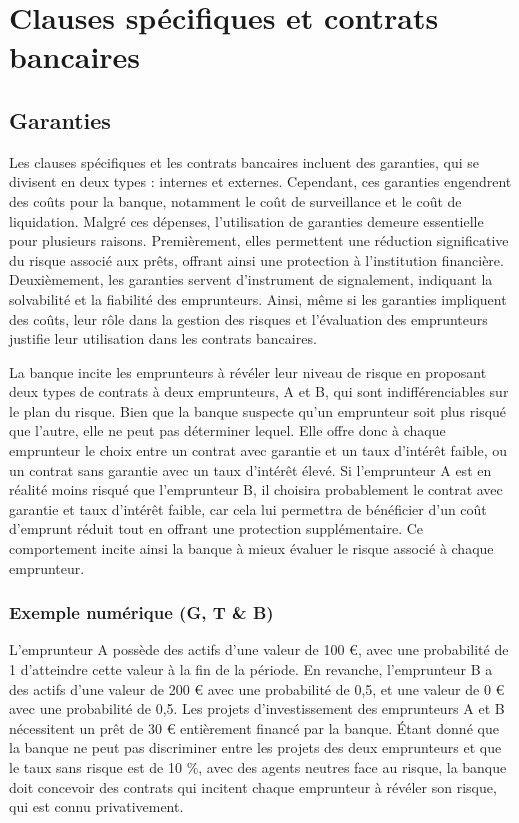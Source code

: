 \documentclass[a4paper, 12pt]{report}
\begin{document}
\section{Clauses spécifiques et contrats bancaires}

\subsection{Garanties}

Les clauses spécifiques et les contrats bancaires incluent des garanties, qui se divisent en deux types : internes et externes. Cependant, ces garanties engendrent des coûts pour la banque, notamment le coût de surveillance et le coût de liquidation. Malgré ces dépenses, l'utilisation de garanties demeure essentielle pour plusieurs raisons. Premièrement, elles permettent une réduction significative du risque associé aux prêts, offrant ainsi une protection à l'institution financière. Deuxièmement, les garanties servent d'instrument de signalement, indiquant la solvabilité et la fiabilité des emprunteurs. Ainsi, même si les garanties impliquent des coûts, leur rôle dans la gestion des risques et l'évaluation des emprunteurs justifie leur utilisation dans les contrats bancaires.

La banque incite les emprunteurs à révéler leur niveau de risque en proposant deux types de contrats à deux emprunteurs, A et B, qui sont indifférenciables sur le plan du risque. Bien que la banque suspecte qu'un emprunteur soit plus risqué que l'autre, elle ne peut pas déterminer lequel. Elle offre donc à chaque emprunteur le choix entre un contrat avec garantie et un taux d'intérêt faible, ou un contrat sans garantie avec un taux d'intérêt élevé. Si l'emprunteur A est en réalité moins risqué que l'emprunteur B, il choisira probablement le contrat avec garantie et taux d'intérêt faible, car cela lui permettra de bénéficier d'un coût d'emprunt réduit tout en offrant une protection supplémentaire. Ce comportement incite ainsi la banque à mieux évaluer le risque associé à chaque emprunteur.

\subsubsection{Exemple numérique (G, T \& B)}

L'emprunteur A possède des actifs d'une valeur de 100 €, avec une probabilité de 1 d'atteindre cette valeur à la fin de la période. En revanche, l'emprunteur B a des actifs d'une valeur de 200 € avec une probabilité de 0,5, et une valeur de 0 € avec une probabilité de 0,5. Les projets d'investissement des emprunteurs A et B nécessitent un prêt de 30 € entièrement financé par la banque. Étant donné que la banque ne peut pas discriminer entre les projets des deux emprunteurs et que le taux sans risque est de 10 \%, avec des agents neutres face au risque, la banque doit concevoir des contrats qui incitent chaque emprunteur à révéler son risque, qui est connu privativement.
\end{document}

